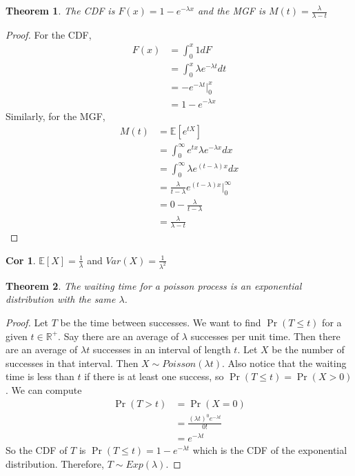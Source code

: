 \documentclass{article}
\newtheorem{theorem}{Theorem}
\theoremstyle{definition}\newtheorem{definition}{DEF}
\theoremstyle{definition}\newtheorem{example}{Ex}
\theoremstyle{lemma}\newtheorem{lemma}{Lemma}
\theoremstyle{corrolary}\newtheorem{corrolary}{Cor}
\begin{document}
\begin{theorem}
The CDF is $F(x)=1-e^{-\lambda x}$ and the MGF is $M(t)=\frac{\lambda}{\lambda - t}$
\end{theorem}
\begin{proof}
For the CDF,
\begin{align*}
F(x)&=\int_0^x 1dF\\
&=\int_0^x \lambda e^{-\lambda t}dt\\
&=-e^{-\lambda t}|_0^x\\
&=1-e^{-\lambda x}
\end{align*}
Similarly, for the MGF,
\begin{align*}
M(t)&=\mathbb{E}[e^{tX}]\\
&=\int_0^\infty e^{tx} \lambda e^{-\lambda x} dx\\
&= \int_0^\infty \lambda e^{(t-\lambda)x}dx\\
&= \frac{\lambda}{t-\lambda} e^{(t-\lambda)x}|_0^\infty\\
&= 0-\frac{\lambda}{t-\lambda}\\
&= \frac{\lambda}{\lambda -t}
\end{align*}
\end{proof}
\begin{corrolary}
$\mathbb{E}[X]=\frac{1}{\lambda}$ and $Var(X)=\frac{1}{\lambda^2}$
\end{corrolary}

\begin{theorem}
The waiting time for a poisson process is an exponential distribution with the same $\lambda$.
\end{theorem}
\begin{proof}
Let $T$ be the time between successes.
We want to find $\Pr(T\leq t)$ for a given $t\in \mathbb{R}^+$.
Say there are an average of $\lambda$ successes per unit time.
Then there are an average of $\lambda t$ successes in an interval of length $t$.
Let $X$ be the number of successes in that interval.
Then $X\sim Poisson(\lambda t)$.
Also notice that the waiting time is less than $t$ if there is at least one success, so $\Pr(T\leq t)=\Pr(X>0)$.
We can compute
\begin{align*}
\Pr(T>t)&=\Pr(X=0)\\
&=\frac{(\lambda t)^0e^{-\lambda t}}{0!}\\
&=e^{-\lambda t}
\end{align*}
So the CDF of $T$ is $\Pr(T\leq t)=1-e^{-\lambda t}$ which is the CDF of the exponential distribution.
Therefore, $T\sim Exp(\lambda)$.
\end{proof}
\end{document}
